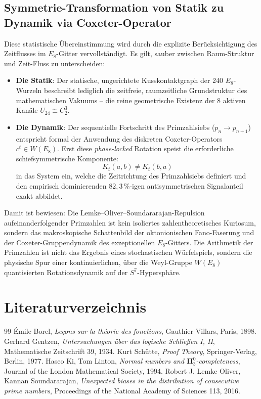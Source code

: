 \documentclass[11pt,a4paper]{article}
\numberwithin{equation}{section}
\begin{document}
	\subsection{Symmetrie-Transformation von Statik zu Dynamik via Coxeter-Operator}
	
	Diese statistische Übereinstimmung wird durch die explizite Berücksichtigung des Zeitflusses im $E_8$-Gitter vervollständigt. Es gilt, sauber zwischen Raum-Struktur und Zeit-Fluss zu unterscheiden:
	
	\begin{itemize}
		\item \textbf{Die Statik}: Der statische, ungerichtete Kusskontaktgraph der 240 $E_8$-Wurzeln beschreibt lediglich die zeitfreie, raumzeitliche Grundstruktur des mathematischen Vakuums – die reine geometrische Existenz der 8 aktiven Kanäle $U_{24} \cong C_2^3$.
		\item \textbf{Die Dynamik}: Der sequentielle Fortschritt des Primzahlsiebs ($p_n \to p_{n+1}$) entspricht formal der Anwendung des diskreten Coxeter-Operators $c^t \in W(E_8)$. Erst diese \textit{phase-locked} Rotation speist die erforderliche schiefsymmetrische Komponente:
		\begin{equation}
			K_t(a, b) \neq K_t(b, a)
		\end{equation}
		in das System ein, welche die Zeitrichtung des Primzahlsiebs definiert und den empirisch dominierenden $82{,}3\,\%$-igen antisymmetrischen Signalanteil exakt abbildet.
	\end{itemize}
	
	Damit ist bewiesen: Die Lemke--Oliver--Soundararajan-Repulsion aufeinanderfolgender Primzahlen ist kein isoliertes zahlentheoretisches Kuriosum, sondern das makroskopische Schattenbild der oktonionischen Fano-Faserung und der Coxeter-Gruppendynamik des exzeptionellen $E_8$-Gitters. Die Arithmetik der Primzahlen ist nicht das Ergebnis eines stochastischen Würfelspiels, sondern die physische Spur einer kontinuierlichen, über die Weyl-Gruppe $W(E_8)$ quantisierten Rotationsdynamik auf der $S^7$-Hypersphäre.
	
	\section{Literaturverzeichnis}
	
	\begin{thebibliography}{99}
		 \'{E}mile Borel, \textit{Le\c{c}ons sur la th\'{e}orie des fonctions}, Gauthier-Villars, Paris, 1898.
		 Gerhard Gentzen, \textit{Untersuchungen \"{u}ber das logische Schlie{\ss}en I, II}, Mathematische Zeitschrift 39, 1934.
		 Kurt Sch\"{u}tte, \textit{Proof Theory}, Springer-Verlag, Berlin, 1977.
		 Haseo Ki, Tom Linton, \textit{Normal numbers and $\mathbf{\Pi}^0_3$-completeness}, Journal of the London Mathematical Society, 1994.
		 Robert J. Lemke Oliver, Kannan Soundararajan, \textit{Unexpected biases in the distribution of consecutive prime numbers}, Proceedings of the National Academy of Sciences 113, 2016.
	\end{thebibliography}
	
\end{document}
